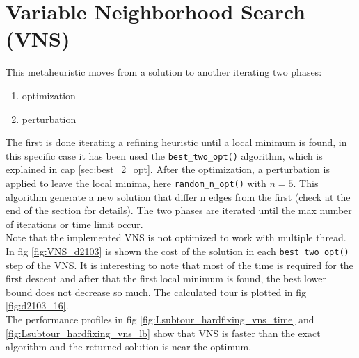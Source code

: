 \section{Variable Neighborhood Search (VNS)}
This metaheuristic moves from a solution to another iterating two phases:
\begin{enumerate}
	\item optimization
	\item perturbation
\end{enumerate}
The first is done iterating a refining heuristic until a local minimum is found, in this specific case it has been used the \texttt{best\_two\_opt()} algorithm, which is explained in cap \ref{sec:best_2_opt}. After the optimization, a perturbation is applied to leave the local minima, here \texttt{random\_n\_opt()} with $ n=5 $. This algorithm generate a new solution that differ n edges from the first (check at the end of the section for details).
The two phases are iterated until the max number of iterations or time limit occur.\\
Note that the implemented VNS is not optimized to work with multiple thread.\\
In fig \ref{fig:VNS_d2103} is shown the cost of the solution in each \texttt{best\_two\_opt()} step of the VNS. It is interesting to note that most of the time is required for the first descent and after that the first local minimum is found, the best lower bound does not decrease so much.
The calculated tour is plotted in fig \ref{fig:d2103_16}.\\
The performance profiles in fig \ref{fig:Lsubtour_hardfixing_vns_time} and \ref{fig:Lsubtour_hardfixing_vns_lb} show that VNS is faster than the exact algorithm and the returned solution is near the optimum.


